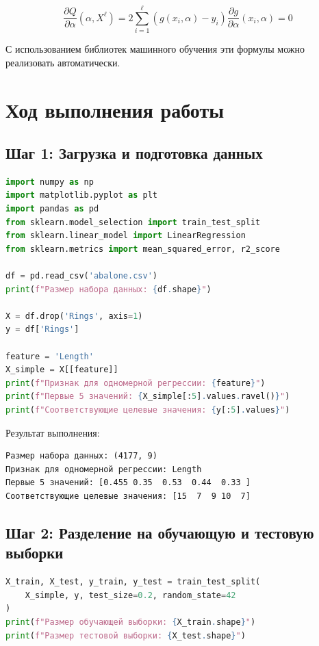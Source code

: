 \[\frac{\partial Q}{\partial \alpha} (\alpha, X^\ell) = 2 \sum_{i=1}^{\ell} (g(x_i, \alpha) - y_i) \frac{\partial g}{\partial \alpha} (x_i, \alpha) = 0\]

С использованием библиотек машинного обучения эти формулы можно реализовать автоматически.

\section{Ход выполнения работы}

\subsection{Шаг 1: Загрузка и подготовка данных}

\begin{lstlisting}[language=Python, caption=Загрузка данных]
import numpy as np
import matplotlib.pyplot as plt
import pandas as pd
from sklearn.model_selection import train_test_split
from sklearn.linear_model import LinearRegression
from sklearn.metrics import mean_squared_error, r2_score

df = pd.read_csv('abalone.csv')
print(f"Размер набора данных: {df.shape}")

X = df.drop('Rings', axis=1)
y = df['Rings']

feature = 'Length'
X_simple = X[[feature]]
print(f"Признак для одномерной регрессии: {feature}")
print(f"Первые 5 значений: {X_simple[:5].values.ravel()}")
print(f"Соответствующие целевые значения: {y[:5].values}")
\end{lstlisting}

Результат выполнения:

\begin{verbatim}
Размер набора данных: (4177, 9)
Признак для одномерной регрессии: Length
Первые 5 значений: [0.455 0.35  0.53  0.44  0.33 ]
Соответствующие целевые значения: [15  7  9 10  7]
\end{verbatim}

\subsection{Шаг 2: Разделение на обучающую и тестовую выборки}

\begin{lstlisting}[language=Python, caption=Разделение данных]
X_train, X_test, y_train, y_test = train_test_split(
    X_simple, y, test_size=0.2, random_state=42
)
print(f"Размер обучающей выборки: {X_train.shape}")
print(f"Размер тестовой выборки: {X_test.shape}")
\end{lstlisting}

